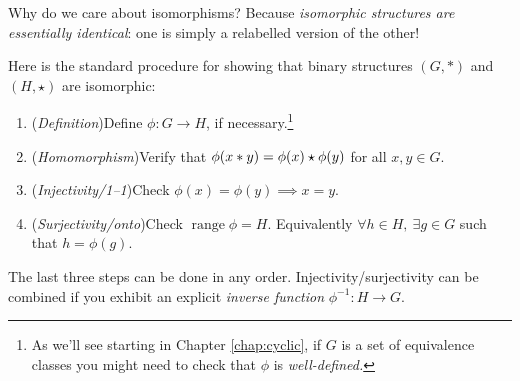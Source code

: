 Why do we care about isomorphisms? Because \emph{isomorphic structures are essentially identical}: one is simply a relabelled version of the other!\medbreak


Here is the standard procedure for showing that binary structures $(G,*)$ and $(H,\star)$ are isomorphic:
\begin{enumerate}\itemsep2pt
	\item (\emph{Definition})\lstsp Define $\phi:G\to H$, if necessary.\footnote{As we'll see starting in Chapter \ref{chap:cyclic}, if $G$ is a set of equivalence classes you might need to check that $\phi$ is \emph{well-defined.}}
	\item (\emph{Homomorphism})\lstsp Verify that $\phi(x\mathbin{\ast} y)=\phi(x)\mathbin{\star}\phi(y)$ for all $x,y\in G$.
	\item (\emph{Injectivity/1--1})\lstsp Check $\phi(x)=\phi(y)\implies x=y$.
	\item (\emph{Surjectivity/onto})\lstsp Check $\operatorname{range}\phi=H$. Equivalently $\forall h\in H,\ \exists g\in G$ such that $h=\phi(g)$.
\end{enumerate}

The last three steps can be done in any order. Injectivity/surjectivity can be combined if you exhibit an explicit \emph{inverse function} $\phi^{-1}:H\to G$.


\goodbreak


